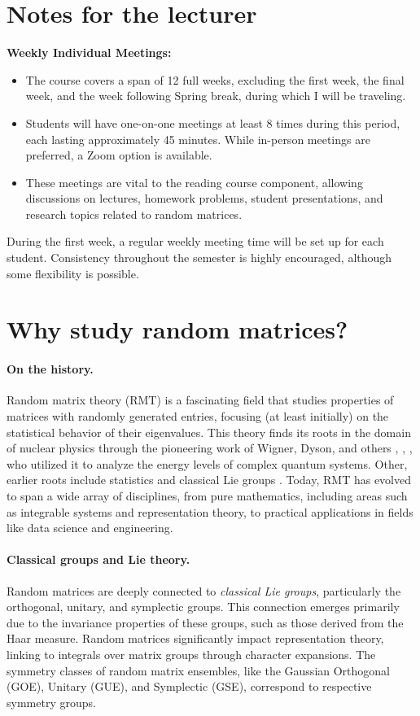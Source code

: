 \documentclass[letterpaper,11pt,oneside,reqno]{article}
\numberwithin{equation}{section}
\theoremstyle{definition}
\newenvironment{lnotes}{\section*{Notes for the lecturer}}{}
\begin{document}
\begin{lnotes}
\textbf{Weekly Individual Meetings:}
\begin{itemize}
				\item The course covers a span of 12 full weeks, excluding the first week, the final week, and the week following Spring break, during which I will be traveling.
				\item Students will have one-on-one meetings at least 8 times during this period, each lasting approximately 45 minutes. While in-person meetings are preferred, a Zoom option is available.
				\item These meetings are vital to the reading course component, allowing discussions on lectures, homework problems, student presentations, and research topics related to random matrices.
\end{itemize}
During the first week, a regular weekly meeting time will be set up for each student. Consistency throughout the semester is highly encouraged, although some flexibility is possible.
\end{lnotes}


\section{Why study random matrices?}

\paragraph{On the history.}
Random matrix theory (RMT) is a fascinating field that
studies
properties of matrices with randomly generated entries,
focusing (at least initially)
on the statistical behavior of their eigenvalues.
This theory finds its roots in the domain of nuclear
physics through the pioneering work of Wigner, Dyson, and
others \cite{wigner1955characteristic},
\cite{dyson1962brownian},
\cite{Dyson1962_III}, who utilized it to analyze the energy levels of complex quantum systems.
Other, earlier roots include statistics \cite{dixon1905generalization}
and classical Lie groups \cite{Hurwitz1897}.
Today, RMT has evolved to span a wide array of disciplines,
from pure mathematics, including areas such as integrable
systems and representation theory, to practical applications
in fields like data science and engineering.

\paragraph{Classical groups and Lie theory.}
Random matrices are deeply connected to \emph{classical Lie groups}, particularly the orthogonal, unitary, and symplectic groups. This connection emerges primarily due to the invariance properties of these groups, such as those derived from the Haar measure.
Random matrices significantly impact representation theory, linking to integrals over matrix groups through character expansions. The symmetry classes of random matrix ensembles, like the Gaussian Orthogonal (GOE), Unitary (GUE), and Symplectic (GSE), correspond to respective symmetry groups.
\end{document}
